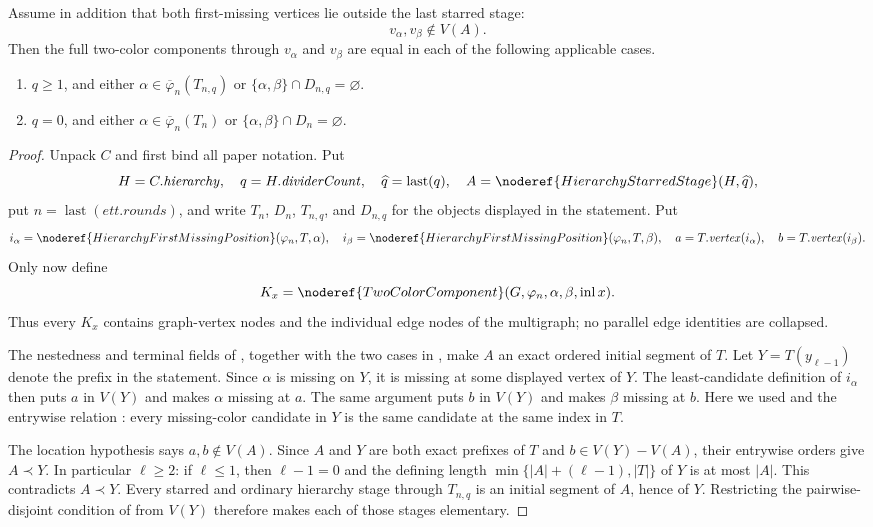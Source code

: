 \begin{lemma}
Assume in addition that both first-missing vertices lie outside the last
starred stage:
\[
        v_\alpha,v_\beta\notin V(A).
\]
Then the full two-color components through $v_\alpha$ and $v_\beta$
are equal in each of the following applicable cases.
\begin{enumerate}
\item $q\geq1$, and either
$\alpha\in\overline\varphi_n(T_{n,q})$ or
$\{\alpha,\beta\}\cap D_{n,q}=\varnothing$.
\item $q=0$, and either
$\alpha\in\overline\varphi_n(T_n)$ or
$\{\alpha,\beta\}\cap D_n=\varnothing$.
\end{enumerate}
\end{lemma}
\begin{proof}
Unpack $C$ and first bind all paper notation.  Put
\[
 H=C.\mathit{hierarchy},\quad
 q=H.\mathit{dividerCount},\quad
 \widehat q=\operatorname{last}(q),\quad
 A=\noderef{HierarchyStarredStage}(H,\widehat q),
\]
put $n=\operatorname{last}(\mathit{ett.rounds})$, and write $T_n$,
$D_n$, $T_{n,q}$, and $D_{n,q}$ for the objects displayed in the
statement.  Put
\[
 i_\alpha=\noderef{HierarchyFirstMissingPosition}(\varphi_n,T,\alpha),
 \quad i_\beta=\noderef{HierarchyFirstMissingPosition}(\varphi_n,T,\beta),
 \quad a=T.\mathit{vertex}(i_\alpha),\quad
 b=T.\mathit{vertex}(i_\beta).
\]
Only now define
\[
 K_x=\noderef{TwoColorComponent}
       (G,\varphi_n,\alpha,\beta,\operatorname{inl}x).
\]
Thus every $K_x$ contains graph-vertex nodes and the individual edge
nodes of the multigraph; no parallel edge identities are collapsed.

The nestedness and terminal fields of
, together with the two cases in
, make $A$ an exact ordered initial
segment of $T$.  Let $Y=T(y_{\ell-1})$ denote the prefix in the
statement.  Since $\alpha$ is missing on $Y$, it is missing at some
displayed vertex of $Y$.  The least-candidate definition of $i_\alpha$
then puts $a$ in $V(Y)$ and makes $\alpha$ missing at $a$.  The same
argument puts $b$ in $V(Y)$ and makes $\beta$ missing at $b$.  Here we
used  and the entrywise relation
: every missing-color candidate in
$Y$ is the same candidate at the same index in $T$.

The location hypothesis says $a,b\notin V(A)$.  Since $A$ and $Y$ are
both exact prefixes of $T$ and $b\in V(Y)-V(A)$, their entrywise orders
give $A\prec Y$.  In particular $\ell\geq2$: if $\ell\leq1$, then
$\ell-1=0$ and the defining length
$\min\{|A|+(\ell-1),|T|\}$ of $Y$ is at most $|A|$.  This contradicts
$A\prec Y$.  Every starred and ordinary hierarchy stage through
$T_{n,q}$ is an initial segment of $A$, hence of $Y$.  Restricting the
pairwise-disjoint condition of
 from $V(Y)$ therefore makes each of
those stages elementary.


\end{proof}
